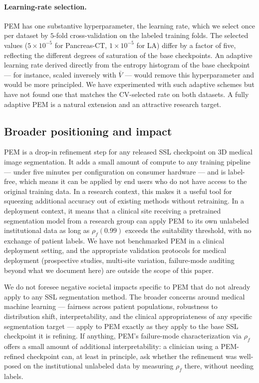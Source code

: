 \paragraph{Learning-rate selection.}
PEM has one substantive hyperparameter, the learning rate, which we select once per dataset by $5$-fold cross-validation on the labeled training folds. The selected values ($5 \times 10^{-5}$ for Pancreas-CT, $1 \times 10^{-5}$ for LA) differ by a factor of five, reflecting the different degrees of saturation of the base checkpoints. An adaptive learning rate derived directly from the entropy histogram of the base checkpoint --- for instance, scaled inversely with $\bar V$ --- would remove this hyperparameter and would be more principled. We have experimented with such adaptive schemes but have not found one that matches the CV-selected rate on both datasets. A fully adaptive PEM is a natural extension and an attractive research target.

\subsection{Broader positioning and impact}
\label{sec:disc:broader}

PEM is a drop-in refinement step for any released SSL checkpoint on 3D medical image segmentation. It adds a small amount of compute to any training pipeline --- under five minutes per configuration on consumer hardware --- and is label-free, which means it can be applied by end users who do not have access to the original training data. In a research context, this makes it a useful tool for squeezing additional accuracy out of existing methods without retraining. In a deployment context, it means that a clinical site receiving a pretrained segmentation model from a research group can apply PEM to its own unlabeled institutional data as long as $\rho_f(0.99)$ exceeds the suitability threshold, with no exchange of patient labels. We have not benchmarked PEM in a clinical deployment setting, and the appropriate validation protocols for medical deployment (prospective studies, multi-site variation, failure-mode auditing beyond what we document here) are outside the scope of this paper.

We do not foresee negative societal impacts specific to PEM that do not already apply to any SSL segmentation method. The broader concerns around medical machine learning --- fairness across patient populations, robustness to distribution shift, interpretability, and the clinical appropriateness of any specific segmentation target --- apply to PEM exactly as they apply to the base SSL checkpoint it is refining. If anything, PEM's failure-mode characterization via $\rho_f$ offers a small amount of additional interpretability: a clinician using a PEM-refined checkpoint can, at least in principle, ask whether the refinement was well-posed on the institutional unlabeled data by measuring $\rho_f$ there, without needing labels.

